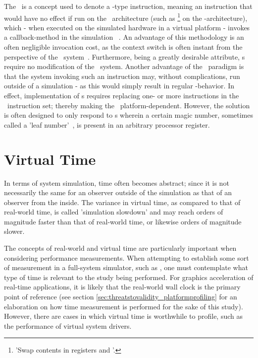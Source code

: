 The \dvttermmagicinstruction\ is a concept used to denote a -type instruction, meaning an instruction that would have no effect if run on the \dvttermtarget\ architecture (such as \footnote{'Swap contents in registers  and '.} on the \dvttermxeightysix -architecture), which - when executed on the simulated hardware in a virtual platform - invokes a callback-method in the simulation \dvttermhost ~.
An advantage of this methodology is an often negligible invocation cost, as the context switch is often instant from the perspective of the \dvttermtarget\ system~.
Furthermore, being a greatly desirable attribute, \dvttermmagicinstruction s require no modification of the \dvttermtarget\ system.
Another advantage of the \dvttermmagicinstruction\ paradigm is that the system invoking such an instruction may, without complications, run outside of a simulation - as this would simply result in regular -behavior.
In effect, implementation of \dvttermmagicinstruction s requires replacing one- or more instructions in the \dvttermtarget\ instruction set; thereby making the \dvttermmagicinstruction\ platform-dependent.
However, the solution is often designed to only respond to \dvttermmagicinstruction s wherein a certain magic number, sometimes called a 'leaf number'~, is present in an arbitrary processor register.

\section{Virtual Time}
\label{sec:backgroundandrelatedwork_virtualtime}
In terms of system simulation, time often becomes abstract; since it is not necessarily the same for an observer outside of the simulation as that of an observer from the inside.
The variance in virtual time, as compared to that of real-world time, is called 'simulation slowdown' and may reach orders of magnitude faster than that of real-world time, or likewise orders of magnitude slower.

The concepts of real-world and virtual time are particularly important when considering performance measurements.
When attempting to establish some sort of measurement in a full-system simulator, such as \dvttermsimics , one must contemplate what type of time is relevant to the study being performed.
For graphics acceleration of real-time applications, it is likely that the real-world wall clock is the primary point of reference (see section \ref{sec:threatstovalidity_platformprofiling} for an elaboration on how time measurement is performed for the sake of this study).
However, there are cases in which virtual time is worthwhile to profile, such as the performance of virtual system drivers.
